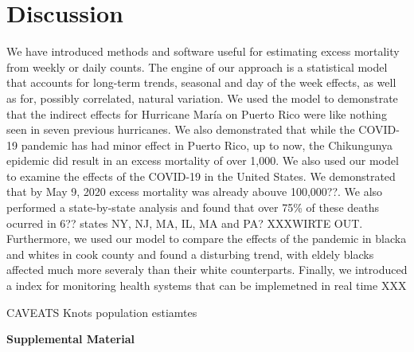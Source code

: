 \documentclass[11pt]{article}
\begin{document}
\section{Discussion}

We have introduced methods and software useful for estimating excess mortality from weekly or daily counts. The engine of our approach is a statistical model that accounts for long-term trends, seasonal and day of the week effects, as well as for, possibly correlated, natural variation.  We used the model to demonstrate that the indirect effects for Hurricane María on Puerto Rico were like nothing seen in seven previous hurricanes. We also demonstrated that while the COVID-19 pandemic has had minor effect in Puerto Rico, up to now, the  Chikungunya epidemic did result in an excess mortality of over 1,000. We also used our model to examine the effects of the COVID-19 in the United States. We demonstrated that by May 9, 2020 excess mortality was already abouve 100,000??. We also performed a state-by-state analysis and found that over 75\% of these deaths ocurred in 6?? states NY, NJ, MA, IL, MA and PA? XXXWIRTE OUT. Furthermore, we used our model to compare the effects of the pandemic in blacka and whites in cook county and found a disturbing trend, with eldely blacks affected much more severaly than their white counterparts. Finally, we introduced a index for monitoring health systems that can be implemetned in real time XXX

CAVEATS
Knots
population estiamtes







\newpage



\newpage
\begin{center}
\LARGE{\textbf{Supplemental Material}}
\end{center}
\end{document}
